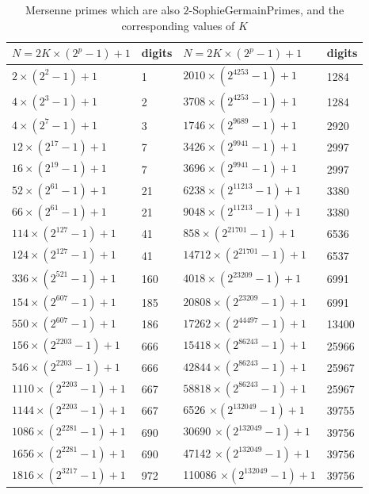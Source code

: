 \documentclass{amsart}
\numberwithin{equation}{section}
\begin{document}
\begin{table}[!h]
	\centering
	\begin{tabular}{|l|l|l|l|}
		\hline
		$N=2K \times (2^p-1)+1$ & \textrm{digits} & $N=2K \times (2^p-1)+1$ & \textrm{digits} \\
		\hline
		$2 \times (2^{2}-1)+1$ & 1  & $2010 \times (2^{4253}-1)+1$ & 1284 \\
		\hline
		$4 \times (2^{3}-1)+1$ & 2  & $3708 \times (2^{4253}-1)+1$ & 1284 \\
		\hline
		$4 \times (2^{7}-1)+1$ & 3  & $1746 \times (2^{9689}-1)+1$ & 2920 \\
		\hline
		$12 \times (2^{17}-1)+1$ & 7  & $3426 \times (2^{9941}-1)+1$ & 2997 \\
		\hline
		$16 \times (2^{19}-1)+1$ & 7 & $3696 \times (2^{9941}-1)+1$ & 2997 \\
		\hline
		$52 \times (2^{61}-1)+1$ & 21  & $6238 \times (2^{11213}-1)+1$ & 3380 \\
		\hline
		$66 \times (2^{61}-1)+1$ & 21  & $9048 \times (2^{11213}-1)+1$ & 3380 \\
		\hline
		$114 \times (2^{127}-1)+1$ & 41  & $858 \times (2^{21701}-1)+1$ & 6536 \\
		\hline
		$124 \times (2^{127}-1)+1$ & 41  & $14712 \times (2^{21701}-1)+1$ & 6537 \\
		\hline
		$336 \times (2^{521}-1)+1$ & 160  & $4018 \times (2^{23209}-1)+1$ & 6991 \\
		\hline
		$154 \times (2^{607}-1)+1$ & 185  & $20808 \times (2^{23209}-1)+1$ & 6991 \\
		\hline
		$550 \times (2^{607}-1)+1$ & 186  & $17262 \times (2^{44497}-1)+1$ & 13400 \\
		\hline
		$156 \times (2^{2203}-1)+1$ & 666  & $15418 \times (2^{86243}-1)+1$ & 25966 \\
		\hline
		$546 \times (2^{2203}-1)+1$ & 666  & $42844 \times (2^{86243}-1)+1$ & 25967 \\
		\hline
		$1110 \times (2^{2203}-1)+1$ & 667  & $58818 \times (2^{86243}-1)+1$ & 25967 \\
		\hline
		$1144 \times (2^{2203}-1)+1$ & 667  & 6526 $\times (2^{132049}-1)+1$ & 39755 \\
		\hline
		$1086 \times (2^{2281}-1)+1$ & 690  & 30690 $\times (2^{132049}-1)+1$ & 39756 \\
		\hline
		$1656 \times (2^{2281}-1)+1$ & 690 & 47142 $\times (2^{132049}-1)+1$ & 39756 \\
		\hline
		$1816 \times (2^{3217}-1)+1$ & 972 & 110086 $\times (2^{132049}-1)+1$  & 39756 \\
		\hline
	\end{tabular}
	\caption{Mersenne primes which are also $2$-SophieGermainPrimes, and the corresponding values of $K$} \label{mers}
\end{table}
\end{document}
